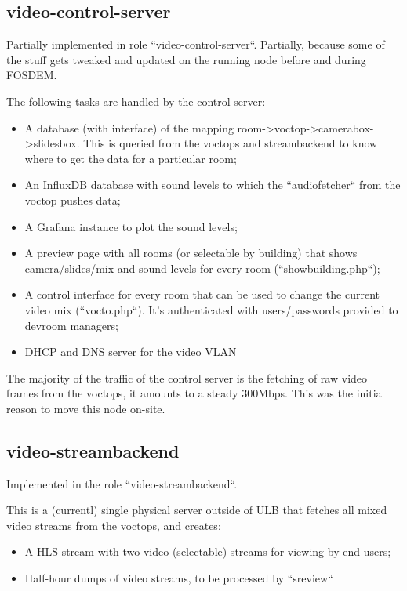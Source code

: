\documentclass{article}
\begin{document}
\subsection{video-control-server}

Partially implemented in role ``video-control-server``. Partially, because some of the stuff gets tweaked and updated on the running node before and during FOSDEM.

The following tasks are handled by the control server:

\begin{itemize}
  \item A database (with interface) of the mapping room->voctop->camerabox->slidesbox. This is queried from the voctops and streambackend to know where to get the data for a particular room;
  \item An InfluxDB database with sound levels to which the ``audiofetcher`` from the voctop pushes data;
  \item A Grafana instance to plot the sound levels;
  \item A preview page with all rooms (or selectable by building) that shows camera/slides/mix and sound levels for every room (``showbuilding.php``);
  \item A control interface for every room that can be used to change the current video mix (``vocto.php``). It's authenticated with users/passwords provided to devroom managers;
  \item DHCP and DNS server for the video VLAN
\end{itemize}

The majority of the traffic of the control server is the fetching of raw video frames from the voctops, it amounts to a steady 300Mbps. This was the initial reason to move this node on-site.

\subsection{video-streambackend}

Implemented in the role ``video-streambackend``.

This is a (currentl) single physical server outside of ULB that fetches all mixed video streams from the voctops, and creates:

\begin{itemize}
  \item A HLS stream with two video (selectable) streams for viewing by end users;
  \item Half-hour dumps of video streams, to be processed by ``sreview``
\end{itemize}
\end{document}
